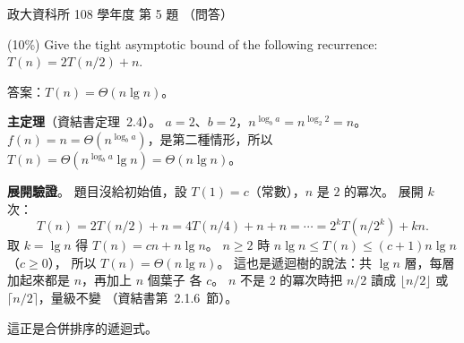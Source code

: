 \begin{pastexam}[label={px:nccu-108-dsa-05}]{政大資科所 108 學年度 第 5 題}
（問答）

(10\%) Give the tight asymptotic bound of the following recurrence: $T(n)=2T(n/2)+n$.
\end{pastexam}

\begin{pastsoln}
答案：$T(n) = \Theta(n \lg n)$。

\textbf{主定理}（資結書定理~2.4）。 $a = 2$、$b = 2$，$n^{\log_b a} = n^{\log_2 2} = n$。 $f(n) = n =
\Theta(n^{\log_b a})$，是第二種情形，所以 $T(n) = \Theta(n^{\log_b a} \lg n) = \Theta(n \lg n)$。

\textbf{展開驗證}。 題目沒給初始值，設 $T(1) = c$（常數），$n$ 是 $2$ 的冪次。 展開 $k$ 次：
\[
T(n) = 2T(n/2) + n = 4T(n/4) + n + n = \cdots = 2^k T(n/2^k) + kn.
\]
取 $k = \lg n$ 得 $T(n) = cn + n \lg n$。 $n \ge 2$ 時 $n \lg n \le T(n) \le (c + 1) n \lg n$（$c \ge 0$），
所以 $T(n) = \Theta(n \lg n)$。 這也是遞迴樹的說法：共 $\lg n$ 層，每層加起來都是 $n$，再加上 $n$ 個葉子
各 $c$。 $n$ 不是 $2$ 的冪次時把 $n/2$ 讀成 $\lfloor n/2 \rfloor$ 或 $\lceil n/2 \rceil$，量級不變
（資結書第~2.1.6~節）。

這正是合併排序的遞迴式。
\end{pastsoln}
